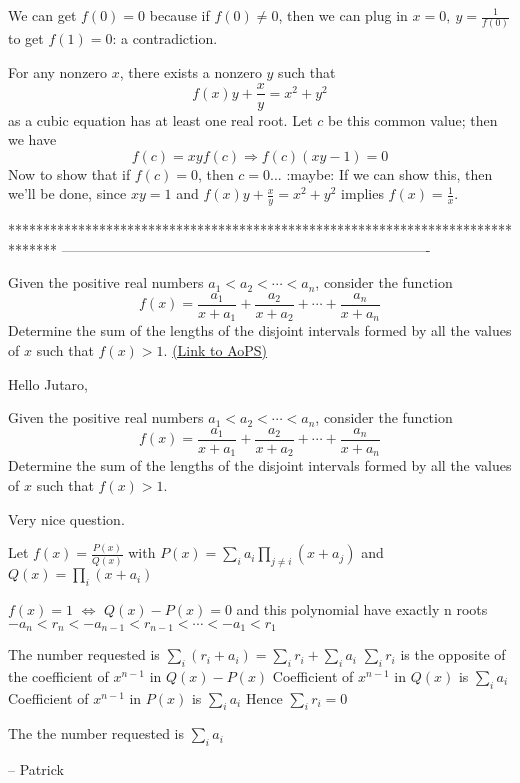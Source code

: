\begin{mysolution}
We can get $f(0)=0$ because if $f(0)\neq 0$, then we can plug in $x=0,\ y=\frac{1}{f(0)}$ to get $f(1)=0$: a contradiction.

For any nonzero $x$, there exists a nonzero $y$ such that
\[f(x)y+\frac{x}{y}=x^{2}+y^{2}\]
as a cubic equation has at least one real root. Let $c$ be this common value; then we have
\[f(c)=xyf(c)\Rightarrow f(c)(xy-1)=0\]
Now to show that if $f(c)=0$, then $c=0$... :maybe: If we can show this, then we'll be done, since $xy=1$ and $f(x)y+\frac{x}{y}=x^{2}+y^{2}$ implies $f(x)=\frac{1}{x}$.

\end{mysolution}
*******************************************************************************
-------------------------------------------------------------------------------

\begin{problem}
	Given the positive real numbers $a_{1}<a_{2}<\cdots<a_{n}$, consider the function \[f(x)=\frac{a_{1}}{x+a_{1}}+\frac{a_{2}}{x+a_{2}}+\cdots+\frac{a_{n}}{x+a_{n}}\] Determine the sum of the lengths of the disjoint intervals formed by all the values of $x$ such that $f(x)>1$.
	\flushright \href{https://artofproblemsolving.com/community/c6h148816}{(Link to AoPS)}
\end{problem}



\begin{mysolution}
	Hello Jutaro,
\begin{tcolorbox}Given the positive real numbers $a_{1}<a_{2}<\cdots<a_{n}$, consider the function
\[f(x)=\frac{a_{1}}{x+a_{1}}+\frac{a_{2}}{x+a_{2}}+\cdots+\frac{a_{n}}{x+a_{n}}\]
Determine the sum of the lengths of the disjoint intervals formed by all the values of $x$ such that $f(x)>1$.\end{tcolorbox}

Very nice question.

Let $f(x)=\frac{P(x)}{Q(x)}$ with $P(x)=\sum_{i}a_{i}\prod_{j\neq i}(x+a_{j})$ and $Q(x)=\prod_{i}(x+a_{i})$

$f(x)=1$ $\Leftrightarrow$ $Q(x)-P(x)=0$ and this polynomial have exactly n roots $-a_{n}<r_{n}<-a_{n-1}<r_{n-1}<\cdots<-a_{1}<r_{1}$

The number requested is $\sum_{i}(r_{i}+a_{i})= \sum_{i}r_{i}+\sum_{i}a_{i}$
$\sum_{i}r_{i}$ is the opposite of the coefficient of $x^{n-1}$ in $Q(x)-P(x)$
Coefficient of $x^{n-1}$ in $Q(x)$ is $\sum_{i}a_{i}$
Coefficient of $x^{n-1}$ in $P(x)$ is $\sum_{i}a_{i}$
Hence $\sum_{i}r_{i}=0$



The the number requested is $\sum_{i}a_{i}$

-- 
Patrick
\end{mysolution}



